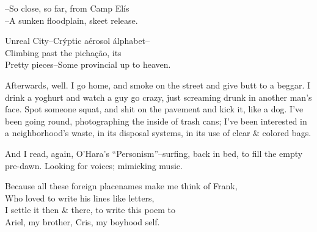 --So close, so far, from Camp Elís \\
--A sunken floodplain, skeet release. %

Unreal City--Crýptic aérosol álphabet-- \\
Climbing past the pichação, its \\
Pretty pieces--Some provincial up to heaven.

Afterwards, well. I go home, and smoke on the street and give butt to a beggar. I drink a yoghurt and watch a guy go crazy, just screaming drunk in another man's face. Spot someone squat, and shit on the pavement and kick it, like a dog. I've been going round, photographing the inside of trash cans; I've been interested in a neighborhood's waste, in its disposal systems, in its use of clear \& colored bags.

And I read, again, O'Hara's ``Personism''--surfing, back in bed, to fill the empty pre-dawn. Looking for voices; mimicking music.

Because all these foreign placenames make me think of Frank, \\
Who loved to write his lines like letters, \\
I settle it then \& there, to write this poem to \\
Ariel, my brother, Cris, my boyhood self.